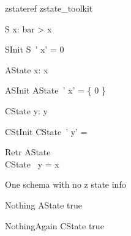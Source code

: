 
\begin{zsection}
   \SECTION zstateref \parents zstate\_toolkit
\end{zsection}


\zstate
\begin{schema}{S}
   x: \nat
\where
   bar > x
\end{schema}

\zstinit
\begin{schema}{SInit}
   S~'
\where
   x' = 0
\end{schema}

\zastate
\begin{schema}{AState}
   x: \power \nat
\where
  x \neq \emptyset
\end{schema}

\zastinit
\begin{schema}{ASInit}
   AState~'
\where
   x' = \{ 0 \}
\end{schema}

\zcstate
\begin{schema}{CState}
  y: \seq \nat
\where
   y \neq \langle \rangle
\end{schema}

\zcstinit
\begin{schema}{CStInit}
   CState~'
\where
  y' =  \rangle
\end{schema}

\zretrieve
\begin{schema}{Retr}
   AState \\
   CState
\where
   \ran~y = x
\end{schema}

One schema with no z state info
\begin{schema}{Nothing}
   \Delta AState
\where
   true
\end{schema}

\begin{schema}{NothingAgain}
   \Delta CState
\where
   true
\end{schema}